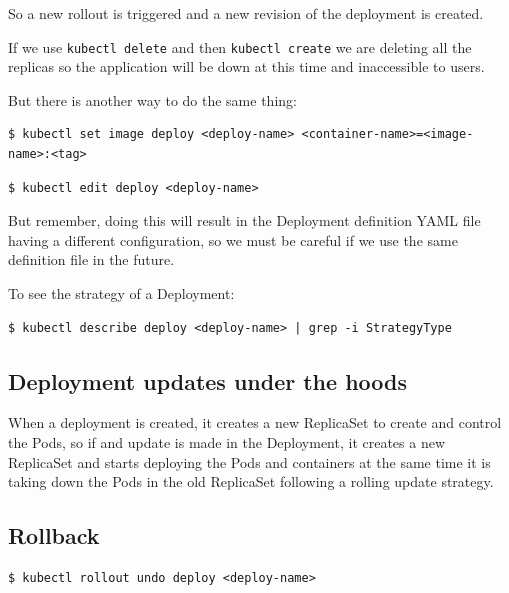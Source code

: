 \documentclass{article}
\newenvironment{blocktemplateIII}[1]{%
    \tcolorbox[beamer,%
    noparskip,breakable,
    ,colframe=Red,%
    colbacklower=LimeGreen!75!LightGreen,%
    title=#1]}%
    {\endtcolorbox}
\newenvironment{codetemplate}[1][]{%
  \mybasecolorbox[#1]
  \itshape
}{%
  \endmybasecolorbox
}
\begin{document}
So a new rollout is triggered and a new revision  of the deployment is created.

\begin{blocktemplateIII}{WARNING}
If we use \verb|kubectl delete| and then \verb|kubectl create| we are deleting all the replicas so the application will be down at this time and inaccessible to users.
\end{blocktemplateIII}

But there is another way to do the same thing:

\begin{codetemplate}{}
\begin{verbatim}
$ kubectl set image deploy <deploy-name> <container-name>=<image-name>:<tag>
\end{verbatim}
\end{codetemplate}

\begin{codetemplate}{}
\begin{verbatim}
$ kubectl edit deploy <deploy-name>
\end{verbatim}
\end{codetemplate}

\begin{blocktemplateIII}{WARNING}
But remember, doing this will result in the Deployment definition YAML file having a different configuration, so we must be careful if we use the same definition file in the future.
\end{blocktemplateIII}

To see the strategy of a Deployment:
\begin{codetemplate}{}
\begin{verbatim}
$ kubectl describe deploy <deploy-name> | grep -i StrategyType
\end{verbatim}
\end{codetemplate}

\subsection{Deployment updates under the hoods}
When a deployment is created, it creates a new ReplicaSet to create and control the Pods, so if and update is made in the Deployment, it creates a new ReplicaSet and starts deploying the Pods and containers at the same time it is taking down the Pods in the old ReplicaSet following a rolling update strategy.

\subsection{Rollback}
\begin{codetemplate}{}
\begin{verbatim}
$ kubectl rollout undo deploy <deploy-name>
\end{verbatim}
\end{codetemplate}
\end{document}
